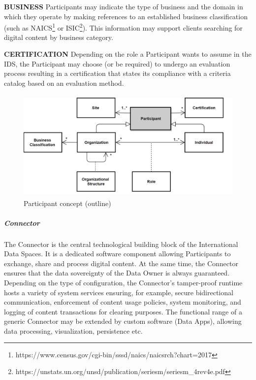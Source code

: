 \textbf{BUSINESS} Participants may indicate the type of business and the domain in which they operate by making references to an established business classification (such as NAICS\footnote{https://www.census.gov/cgi-bin/sssd/naics/naicsrch?chart=2017 } or ISIC\footnote{https://unstats.un.org/unsd/publication/seriesm/seriesm\_4rev4e.pdf }). This information may support clients searching for digital content by business category. 

\textbf{CERTIFICATION} Depending on the role a Participant wants to assume in the IDS, the Participant may choose (or be required) to undergo an evaluation process resulting in a certification that states its compliance with a criteria catalog based on an evaluation method.




\begin{figure}[H]
	\begin{Center}
		\includegraphics[width=4.68in,height=2.15in]{./media/image49.png}
		\caption{Participant concept (outline)}
		\label{fig:Participant_concept_outline}
	\end{Center}
\end{figure}



\subparagraph*{Connector}
The Connector is the central technological building block of the International Data Spaces. It is a dedicated software component allowing Participants to exchange, share and process digital content. At the same time, the Connector ensures that the data sovereignty of the Data Owner is always guaranteed. Depending on the type of configuration, the Connector’s tamper-proof runtime hosts a variety of system services ensuring, for example, secure bidirectional communication, enforcement of content usage policies, system monitoring, and logging of content transactions for clearing purposes. The functional range of a generic Connector may be extended by custom software (Data Apps), allowing data processing, visualization, persistence etc. 

